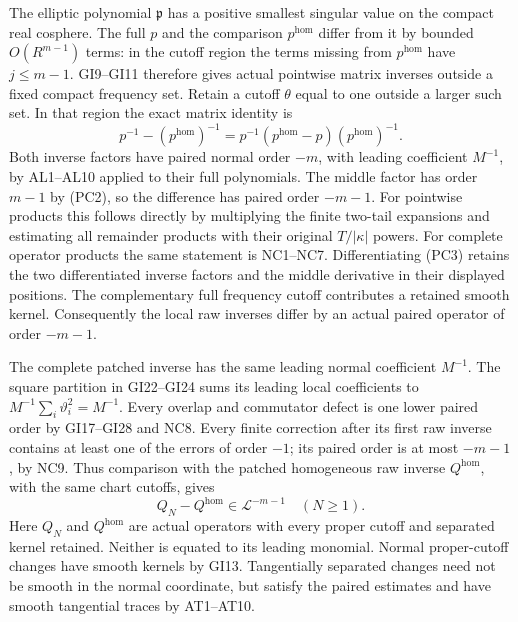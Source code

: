 \documentclass[
  11pt,
]{article}
\makeatletter
\let\ReaderOriginalAnchorStart\hyper@anchorstart
\let\ReaderOriginalAnchorEnd\hyper@anchorend
\let\ReaderPendingAliases\@empty
\def\ReaderArmAliases#1{\gdef\ReaderPendingAliases{#1}}
\def\hyper@anchorstart#1{\ReaderIfNativeAnchorTF{#1}{\ReaderPendingAliases\global\let\ReaderPendingAliases\@empty}{}\ReaderOriginalAnchorStart{#1}}
\makeatother
\begin{document}
The elliptic polynomial \(\mathfrak p\) has a positive smallest singular
value on the compact real cosphere. The full \(p\) and the comparison
\(p^{\mathrm{hom}}\) differ from it by bounded \(O(R^{m-1})\) terms: in
the cutoff region the terms missing from \(p^{\mathrm{hom}}\) have
\(j\leq m-1\). GI9--GI11 therefore gives actual pointwise matrix
inverses outside a fixed compact frequency set. Retain a cutoff
\(\theta\) equal to one outside a larger such set. In that region the
exact matrix identity is \[
 p^{-1}-(p^{\mathrm{hom}})^{-1}
       =p^{-1}(p^{\mathrm{hom}}-p)(p^{\mathrm{hom}})^{-1}.
 \tag{PC3}
\] Both inverse factors have paired normal order \(-m\), with leading
coefficient \(M^{-1}\), by AL1--AL10 applied to their full polynomials.
The middle factor has order \(m-1\) by (PC2), so the difference has
paired order \(-m-1\). For pointwise products this follows directly by
multiplying the finite two-tail expansions and estimating all remainder
products with their original \(T/|\kappa|\) powers. For complete
operator products the same statement is NC1--NC7. Differentiating (PC3)
retains the two differentiated inverse factors and the middle derivative
in their displayed positions. The complementary full frequency cutoff
contributes a retained smooth kernel. Consequently the local raw
inverses differ by an actual paired operator of order \(-m-1\).

The complete patched inverse has the same leading normal coefficient
\(M^{-1}\). The square partition in GI22--GI24 sums its leading local
coefficients to \(M^{-1}\sum_i\vartheta_i^2=M^{-1}\). Every overlap and
commutator defect is one lower paired order by GI17--GI28 and NC8. Every
finite correction after its first raw inverse contains at least one of
the errors of order \(-1\); its paired order is at most \(-m-1\), by
NC9. Thus comparison with the patched homogeneous raw inverse
\(Q^{\mathrm{hom}}\), with the same chart cutoffs, gives \[
 Q_N-Q^{\mathrm{hom}}\in\mathcal L^{-m-1}
 \quad(N\geq1).
 \tag{PC4}
\] Here \(Q_N\) and \(Q^{\mathrm{hom}}\) are actual operators with every
proper cutoff and separated kernel retained. Neither is equated to its
leading monomial. Normal proper-cutoff changes have smooth kernels by
GI13. Tangentially separated changes need not be smooth in the normal
coordinate, but satisfy the paired estimates and have smooth tangential
traces by AT1--AT10.

\ReaderArmAliases{\ReaderOriginalAnchorStart{AN03-GCF-FOUNDATION-027}\ReaderOriginalAnchorEnd\begingroup\expandafter\def\csname @currentHref\endcsname{AN03-GCF-FOUNDATION-027}\label{AN03-GCF-FOUNDATION-027}\endgroup\ReaderOriginalAnchorStart{pc-cauchy-residue}\ReaderOriginalAnchorEnd}
\end{document}
